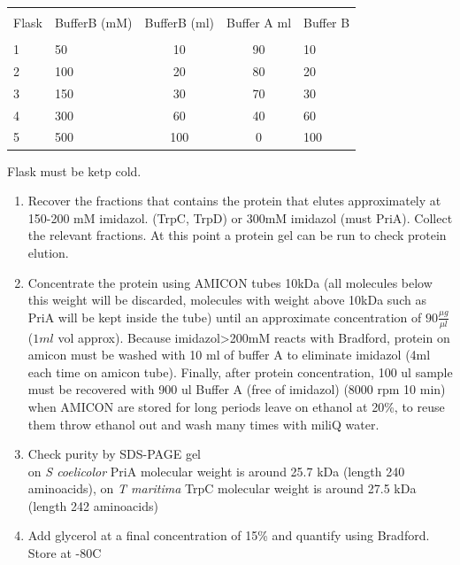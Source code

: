 \documentclass[12pt,twoside]{reedthesis}
\begin{document}
{  \label{my-label enzyme}
  
  \begin{tabular}{ l l c c l}
  \hline \\ [-1.5ex]
  Flask & BufferB (mM)   & BufferB (ml)  & Buffer A ml & Buffer B  \\  [1ex]
  \hline \\ [-1.5ex]
  1 & 50& 10&  90& 10 \\  [1ex]
  2 & 100& 20& 80& 20 \\  [1ex]
  3 & 150& 30& 70 & 30 \\  [1ex]
  4 & 300& 60& 40 & 60 \\  [1ex]
  5 & 500& 100& 0& 100 \\  [1ex]
  \hline
  \end{tabular}
  
  Flask must be ketp cold.
  
  \begin{enumerate}
  \def\labelenumi{\arabic{enumi}.}
  \setcounter{enumi}{6}
  \item
    Recover the fractions that contains the protein that elutes
    approximately at 150-200 mM imidazol. (TrpC, TrpD) or 300mM imidazol
    (must PriA). Collect the relevant fractions. At this point a protein
    gel can be run to check protein elution.
  \item
    Concentrate the protein using AMICON tubes 10kDa (all molecules below
    this weight will be discarded, molecules with weight above 10kDa such
    as PriA will be kept inside the tube) until an approximate
    concentration of \(90 \frac{\mu g}{\mu l}\) (\(1ml\) vol approx).
    Because imidazol\textgreater{}200mM reacts with Bradford, protein on
    amicon must be washed with 10 ml of buffer A to eliminate imidazol
    (4ml each time on amicon tube). Finally, after protein concentration,
    100 ul sample must be recovered with 900 ul Buffer A (free of
    imidazol) (8000 rpm 10 min) when AMICON are stored for long periods
    leave on ethanol at 20\%, to reuse them throw ethanol out and wash
    many times with miliQ water.
  \item
    Check purity by SDS-PAGE gel\\
    on \emph{S coelicolor} PriA molecular weight is around 25.7 kDa
    (length 240 aminoacids), on \emph{T maritima} TrpC molecular weight is
    around 27.5 kDa (length 242 aminoacids)
  \item
    Add glycerol at a final concentration of 15\% and quantify using
    Bradford. Store at -80C
  \end{enumerate}
  
}
\end{document}
